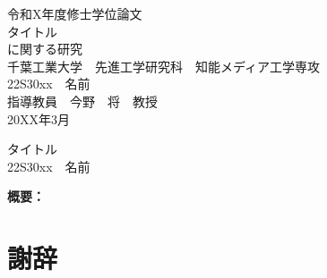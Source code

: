 \documentclass[12pt,a4paper]{jreport}
\newenvironment{longbox}{%
  \def\FrameCommand{\fboxsep=\FrameSep \fbox}%
  \MakeFramed {\FrameRestore}}%
 {\endMakeFramed}
\begin{document}
%
%
\begin{titlepage}
\begin{center}
{\large 令和X年度修士学位論文\\}
 \vspace{3cm}
 {\Huge タイトル\\
\vspace{5mm}に関する研究\\}
\vspace{4cm}
{\large%
  千葉工業大学~~先進工学研究科~~知能メディア工学専攻\\
\vspace{3mm}22S30xx~~名前\\
\vspace{3cm}指導教員~~今野~~将~~教授\\
\vspace{1cm}20XX年3月\\
}
\end{center}
\end{titlepage}

\begin{titlepage}
\begin{longbox}
\begin{center}
 {\Huge タイトル}\\
 {\large%
   \vspace{3mm}%
   22S30xx~~名前\\
 }
\end{center}
{\bf 概要：}%




\end{longbox}
\end{titlepage}




\newpage
\tableofcontents

\newpage
\setcounter{page}{0}


\chapter*{謝辞}
\nocite{*}
\end{document}
